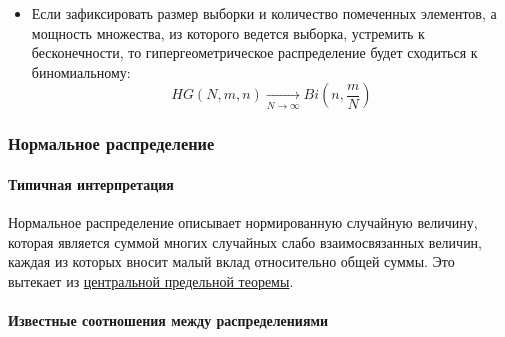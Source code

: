 \documentclass[
  russian,
  a4paper,
]{article}
\providecommand{\tightlist}{%
  \setlength{\itemsep}{0pt}\setlength{\parskip}{0pt}}
\let\oldparagraph\paragraph
\renewcommand{\paragraph}[1]{\oldparagraph{#1}\mbox{}}
\begin{document}
\begin{itemize}
\tightlist
\item
  Если зафиксировать размер выборки и количество помеченных элементов, а
  мощность множества, из которого ведется выборка, устремить к
  бесконечности, то гипергеометрическое распределение будет сходиться к
  биномиальному:
  \[HG(N, m, n) \underset{N\to\infty}{\longrightarrow} Bi\left(n, \frac{m}{N}\right)\]
\end{itemize}

\hypertarget{ux43dux43eux440ux43cux430ux43bux44cux43dux43eux435-ux440ux430ux441ux43fux440ux435ux434ux435ux43bux435ux43dux438ux435-1}{%
\subsubsection{Нормальное
распределение}\label{ux43dux43eux440ux43cux430ux43bux44cux43dux43eux435-ux440ux430ux441ux43fux440ux435ux434ux435ux43bux435ux43dux438ux435-1}}

\hypertarget{ux442ux438ux43fux438ux447ux43dux430ux44f-ux438ux43dux442ux435ux440ux43fux440ux435ux442ux430ux446ux438ux44f-1}{%
\paragraph{Типичная
интерпретация}\label{ux442ux438ux43fux438ux447ux43dux430ux44f-ux438ux43dux442ux435ux440ux43fux440ux435ux442ux430ux446ux438ux44f-1}}

Нормальное распределение описывает нормированную случайную величину,
которая является суммой многих случайных слабо взаимосвязанных величин,
каждая из которых вносит малый вклад относительно общей суммы. Это
вытекает из
\href{https://ru.wikipedia.org/wiki/Центральная_предельная_теорема}{центральной
предельной теоремы}.

\hypertarget{ux438ux437ux432ux435ux441ux442ux43dux44bux435-ux441ux43eux43eux442ux43dux43eux448ux435ux43dux438ux44f-ux43cux435ux436ux434ux443-ux440ux430ux441ux43fux440ux435ux434ux435ux43bux435ux43dux438ux44fux43cux438-1}{%
\paragraph{Известные соотношения между
распределениями}\label{ux438ux437ux432ux435ux441ux442ux43dux44bux435-ux441ux43eux43eux442ux43dux43eux448ux435ux43dux438ux44f-ux43cux435ux436ux434ux443-ux440ux430ux441ux43fux440ux435ux434ux435ux43bux435ux43dux438ux44fux43cux438-1}}
\end{document}
